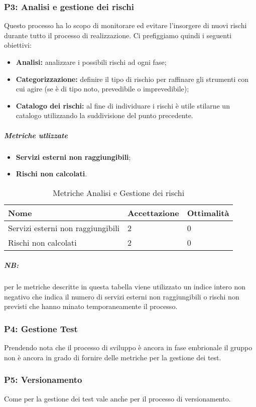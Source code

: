 \subsubsection{P3: Analisi e gestione dei rischi}
Questo processo ha lo scopo di monitorare ed evitare l'insorgere di nuovi rischi durante tutto il processo di realizzazione. Ci prefiggiamo quindi i seguenti obiettivi:
\begin{itemize}
	\item{\textbf{Analisi:} analizzare i possibili rischi ad ogni fase;}
	\item{\textbf{Categorizzazione:}  definire il tipo di rischio per raffinare gli strumenti con cui agire (se è di tipo noto, prevedibile o imprevedibile);}
	\item{\textbf{Catalogo dei rischi:} al fine di individuare i rischi è utile stilarne un catalogo utilizzando la suddivisione del punto precedente.}
\end{itemize}
\subparagraph{Metriche utlizzate}
\begin{itemize}
	\item{\textbf{Servizi esterni non raggiungibili};}
	\item{\textbf{Rischi non calcolati}.}
\end{itemize}
\begin{table}[!htbp]
	\centering
	\renewcommand{\arraystretch}{2} 
		\begin{tabular}{|l|l|l|}
			\rowcolor{orange!50}
			\hline
			Nome & Accettazione & Ottimalità \\
			\hline
			Servizi esterni non raggiungibili & 2 & 0 \\
			\hline
			Rischi non calcolati & 2 & 0 \\
			\hline
		\end{tabular}
	\caption{Metriche Analisi e Gestione dei rischi}
\end{table}
\subparagraph{\textbf{NB}:} per le metriche descritte in questa tabella viene utilizzato un indice intero non negativo che indica il numero di servizi esterni non raggiungibili o rischi non previsti che hanno minato temporaneamente il processo.
\newpage
\subsubsection{P4: Gestione Test}
Prendendo nota che il processo di sviluppo è ancora in fase embrionale il gruppo non è ancora in grado di fornire delle metriche per la gestione dei test.
\subsubsection{P5: Versionamento}
Come per la gestione dei test vale anche per il processo di versionamento.
